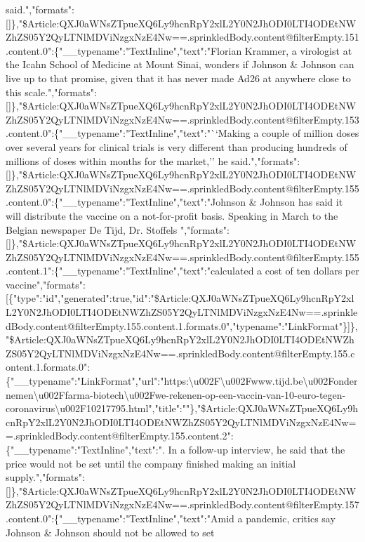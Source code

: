 said.","formats":{[}{]}\},"\$Article:QXJ0aWNsZTpueXQ6Ly9hcnRpY2xlL2Y0N2JhODI0LTI4ODEtNWZhZS05Y2QyLTNlMDViNzgxNzE4Nw==.sprinkledBody.content@filterEmpty.151.content.0":\{"\_\_typename":"TextInline","text":"Florian
Krammer, a virologist at the Icahn School of Medicine at Mount Sinai,
wonders if Johnson \& Johnson can live up to that promise, given that it
has never made Ad26 at anywhere close to this
scale.","formats":{[}{]}\},"\$Article:QXJ0aWNsZTpueXQ6Ly9hcnRpY2xlL2Y0N2JhODI0LTI4ODEtNWZhZS05Y2QyLTNlMDViNzgxNzE4Nw==.sprinkledBody.content@filterEmpty.153.content.0":\{"\_\_typename":"TextInline","text":"``Making
a couple of million doses over several years for clinical trials is very
different than producing hundreds of millions of doses within months for
the market,'' he
said.","formats":{[}{]}\},"\$Article:QXJ0aWNsZTpueXQ6Ly9hcnRpY2xlL2Y0N2JhODI0LTI4ODEtNWZhZS05Y2QyLTNlMDViNzgxNzE4Nw==.sprinkledBody.content@filterEmpty.155.content.0":\{"\_\_typename":"TextInline","text":"Johnson
\& Johnson has said it will distribute the vaccine on a not-for-profit
basis. Speaking in March to the Belgian newspaper De Tijd, Dr. Stoffels
","formats":{[}{]}\},"\$Article:QXJ0aWNsZTpueXQ6Ly9hcnRpY2xlL2Y0N2JhODI0LTI4ODEtNWZhZS05Y2QyLTNlMDViNzgxNzE4Nw==.sprinkledBody.content@filterEmpty.155.content.1":\{"\_\_typename":"TextInline","text":"calculated
a cost of ten dollars per
vaccine","formats":{[}\{"type":"id","generated":true,"id":"\$Article:QXJ0aWNsZTpueXQ6Ly9hcnRpY2xlL2Y0N2JhODI0LTI4ODEtNWZhZS05Y2QyLTNlMDViNzgxNzE4Nw==.sprinkledBody.content@filterEmpty.155.content.1.formats.0","typename":"LinkFormat"\}{]}\},"\$Article:QXJ0aWNsZTpueXQ6Ly9hcnRpY2xlL2Y0N2JhODI0LTI4ODEtNWZhZS05Y2QyLTNlMDViNzgxNzE4Nw==.sprinkledBody.content@filterEmpty.155.content.1.formats.0":\{"\_\_typename":"LinkFormat","url":"https:\textbackslash{}u002F\textbackslash{}u002Fwww.tijd.be\textbackslash{}u002Fondernemen\textbackslash{}u002Ffarma-biotech\textbackslash{}u002Fwe-rekenen-op-een-vaccin-van-10-euro-tegen-coronavirus\textbackslash{}u002F10217795.html","title":""\},"\$Article:QXJ0aWNsZTpueXQ6Ly9hcnRpY2xlL2Y0N2JhODI0LTI4ODEtNWZhZS05Y2QyLTNlMDViNzgxNzE4Nw==.sprinkledBody.content@filterEmpty.155.content.2":\{"\_\_typename":"TextInline","text":".
In a follow-up interview, he said that the price would not be set until
the company finished making an initial
supply.","formats":{[}{]}\},"\$Article:QXJ0aWNsZTpueXQ6Ly9hcnRpY2xlL2Y0N2JhODI0LTI4ODEtNWZhZS05Y2QyLTNlMDViNzgxNzE4Nw==.sprinkledBody.content@filterEmpty.157.content.0":\{"\_\_typename":"TextInline","text":"Amid
a pandemic, critics say Johnson \& Johnson should not be allowed to set
